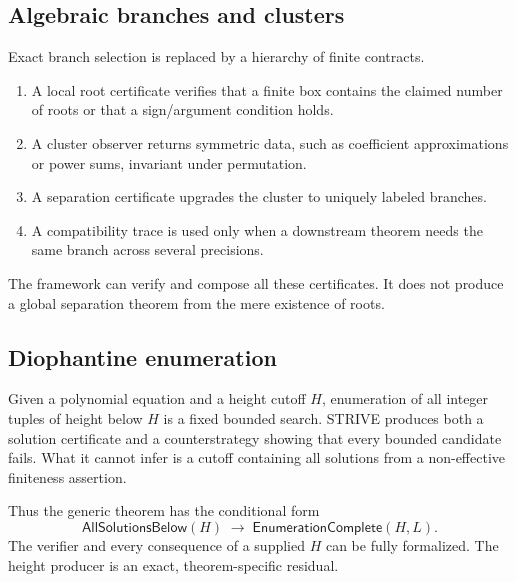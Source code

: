 \subsection{Algebraic branches and clusters}

Exact branch selection is replaced by a hierarchy of finite contracts.

\begin{enumerate}
\item A local root certificate verifies that a finite box contains the claimed
number of roots or that a sign/argument condition holds.
\item A cluster observer returns symmetric data, such as coefficient
approximations or power sums, invariant under permutation.
\item A separation certificate upgrades the cluster to uniquely labeled
branches.
\item A compatibility trace is used only when a downstream theorem needs the
same branch across several precisions.
\end{enumerate}

The framework can verify and compose all these certificates.  It does not
produce a global separation theorem from the mere existence of roots.

\subsection{Diophantine enumeration}

Given a polynomial equation and a height cutoff \(H\), enumeration of all
integer tuples of height below \(H\) is a fixed bounded search.  STRIVE produces
both a solution certificate and a counterstrategy showing that every bounded
candidate fails.  What it cannot infer is a cutoff containing all solutions
from a non-effective finiteness assertion.

Thus the generic theorem has the conditional form
\[
 \mathsf{AllSolutionsBelow}(H)
 \;\longrightarrow\;
 \mathsf{EnumerationComplete}(H,L).
\]
The verifier and every consequence of a supplied \(H\) can be fully formalized.
The height producer is an exact, theorem-specific residual.
